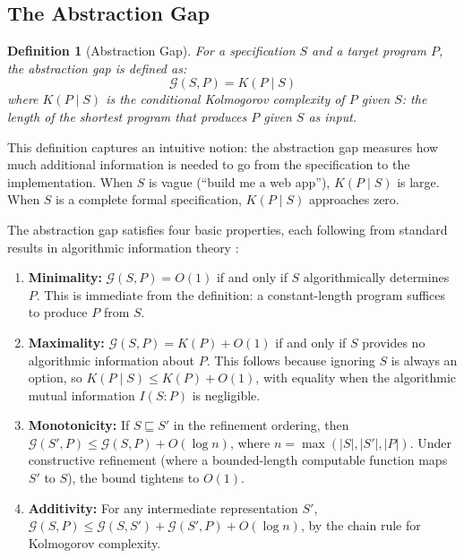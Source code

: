 \documentclass[11pt, a4paper, logo, copyright]{googledeepmind}
\newtheorem{definition}{Definition}[section]
\begin{document}
\subsection{The Abstraction Gap}

\begin{definition}[Abstraction Gap]
\label{def:abstraction-gap}
For a specification $S$ and a target program $P$, the \emph{abstraction gap} is defined as:
\begin{equation}
    \mathcal{G}(S, P) = K(P \mid S)
\end{equation}
where $K(P \mid S)$ is the conditional Kolmogorov complexity of $P$ given $S$: the length of the shortest program that produces $P$ given $S$ as input.
\end{definition}

This definition captures an intuitive notion: the abstraction gap measures how much additional information is needed to go from the specification to the implementation. When $S$ is vague (``build me a web app''), $K(P \mid S)$ is large. When $S$ is a complete formal specification, $K(P \mid S)$ approaches zero.

The abstraction gap satisfies four basic properties, each following from standard results in algorithmic information theory \citep{li2019introduction}:

\begin{enumerate}[label=(\alph*)]
    \item \textbf{Minimality:} $\mathcal{G}(S, P) = O(1)$ if and only if $S$ algorithmically determines $P$. This is immediate from the definition: a constant-length program suffices to produce $P$ from $S$.
    \item \textbf{Maximality:} $\mathcal{G}(S, P) = K(P) + O(1)$ if and only if $S$ provides no algorithmic information about $P$. This follows because ignoring $S$ is always an option, so $K(P \mid S) \leq K(P) + O(1)$, with equality when the algorithmic mutual information $I(S : P)$ is negligible.
    \item \textbf{Monotonicity:} If $S \sqsubseteq S'$ in the refinement ordering, then $\mathcal{G}(S', P) \leq \mathcal{G}(S, P) + O(\log n)$, where $n = \max(|S|, |S'|, |P|)$. Under constructive refinement (where a bounded-length computable function maps $S'$ to $S$), the bound tightens to $O(1)$.
    \item \textbf{Additivity:} For any intermediate representation $S'$, $\mathcal{G}(S, P) \leq \mathcal{G}(S, S') + \mathcal{G}(S', P) + O(\log n)$, by the chain rule for Kolmogorov complexity.
\end{enumerate}
\end{document}
